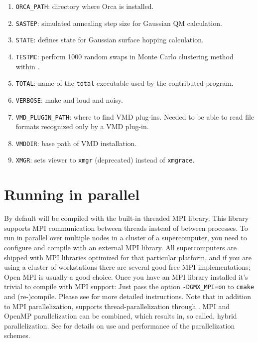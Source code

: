 \begin{enumerate}
        {\tt {}}.
\item   {\tt ORCA_PATH}: directory where Orca is installed.
\item   {\tt SASTEP}: simulated annealing step size for Gaussian QM calculation.
\item   {\tt STATE}: defines state for Gaussian surface hopping calculation.
\item   {\tt TESTMC}: perform 1000 random swaps in Monte Carlo clustering method
        within {\tt {}}.
\item   {\tt TOTAL}: name of the {\tt total} executable used by the contributed
        {\tt {}} program.
\item   {\tt VERBOSE}: make {\tt {}} and {\tt {}}
        loud and noisy.
\item   {\tt VMD_PLUGIN_PATH}: where to find VMD plug-ins. Needed to be
        able to read file formats recognized only by a VMD plug-in.
\item   {\tt VMDDIR}: base path of VMD installation.
\item   {\tt XMGR}: sets viewer to {\tt xmgr} (deprecated) instead of {\tt xmgrace}.

\end{enumerate}

\section{Running {\gromacs} in parallel}
By default {\gromacs} will be compiled with the built-in threaded MPI library.
This library supports MPI communication between threads instead of between
processes. To run {\gromacs} in parallel over multiple nodes in a cluster
of a supercomputer, you need to configure and compile {\gromacs} with an external
MPI library. All supercomputers are shipped with MPI libraries optimized for 
that particular platform, and if you are using a cluster of workstations
there are several good free MPI implementations;
Open MPI is usually a good choice. Once you have an MPI library
installed it's trivial to compile {\gromacs} with MPI support: Just pass
the option {\tt -DGMX_MPI=on} to {\tt cmake} and (re-)compile. Please see
{\wwwpage} for more detailed instructions.
Note that in addition to MPI parallelization, {\gromacs} supports
thread-parallelization through . MPI and OpenMP parallelization
can be combined, which results in, so called, hybrid parallelization.
See {\wwwpage} for details on use and performance of the parallelization
schemes.

